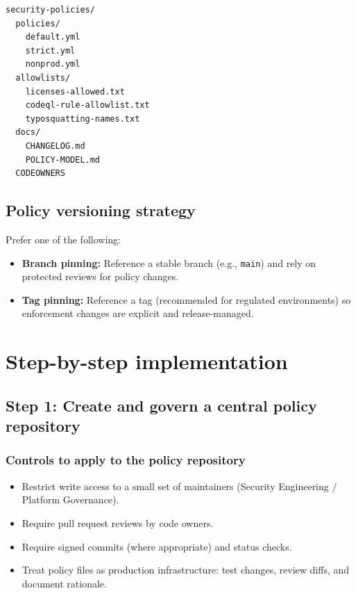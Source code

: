 \documentclass[11pt]{article}
\renewcommand{\cmd}[1]{\texttt{#1}}
\begin{document}
\begin{verbatim}
security-policies/
  policies/
    default.yml
    strict.yml
    nonprod.yml
  allowlists/
    licenses-allowed.txt
    codeql-rule-allowlist.txt
    typosquatting-names.txt
  docs/
    CHANGELOG.md
    POLICY-MODEL.md
  CODEOWNERS
\end{verbatim}

\subsection{Policy versioning strategy}

Prefer one of the following:
\begin{itemize}[leftmargin=*]
  \item \textbf{Branch pinning:} Reference a stable branch (e.g., \cmd{main}) and rely on protected reviews for policy changes.
  \item \textbf{Tag pinning:} Reference a tag (recommended for regulated environments) so enforcement changes are explicit and release-managed.
\end{itemize}

\section{Step-by-step implementation}

\subsection{Step 1: Create and govern a central policy repository}

\subsubsection{Controls to apply to the policy repository}

\begin{itemize}[leftmargin=*]
  \item Restrict write access to a small set of maintainers (Security Engineering / Platform Governance).
  \item Require pull request reviews by code owners.
  \item Require signed commits (where appropriate) and status checks.
  \item Treat policy files as production infrastructure: test changes, review diffs, and document rationale.
\end{itemize}
\end{document}
